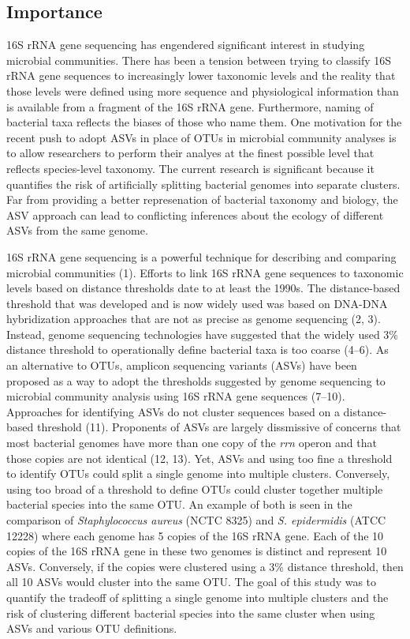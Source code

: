 \documentclass[
]{article}
\begin{document}
\hypertarget{importance}{%
\subsection{Importance}\label{importance}}

16S rRNA gene sequencing has engendered significant interest in studying
microbial communities. There has been a tension between trying to
classify 16S rRNA gene sequences to increasingly lower taxonomic levels
and the reality that those levels were defined using more sequence and
physiological information than is available from a fragment of the 16S
rRNA gene. Furthermore, naming of bacterial taxa reflects the biases of
those who name them. One motivation for the recent push to adopt ASVs in
place of OTUs in microbial community analyses is to allow researchers to
perform their analyes at the finest possible level that reflects
species-level taxonomy. The current research is significant because it
quantifies the risk of artificially splitting bacterial genomes into
separate clusters. Far from providing a better represenation of
bacterial taxonomy and biology, the ASV approach can lead to conflicting
inferences about the ecology of different ASVs from the same genome.

\newpage

16S rRNA gene sequencing is a powerful technique for describing and
comparing microbial communities (1). Efforts to link 16S rRNA gene
sequences to taxonomic levels based on distance thresholds date to at
least the 1990s. The distance-based threshold that was developed and is
now widely used was based on DNA-DNA hybridization approaches that are
not as precise as genome sequencing (2, 3). Instead, genome sequencing
technologies have suggested that the widely used 3\% distance threshold
to operationally define bacterial taxa is too coarse (4--6). As an
alternative to OTUs, amplicon sequencing variants (ASVs) have been
proposed as a way to adopt the thresholds suggested by genome sequencing
to microbial community analysis using 16S rRNA gene sequences (7--10).
Approaches for identifying ASVs do not cluster sequences based on a
distance-based threshold (11). Proponents of ASVs are largely
dissmissive of concerns that most bacterial genomes have more than one
copy of the \emph{rrn} operon and that those copies are not identical
(12, 13). Yet, ASVs and using too fine a threshold to identify OTUs
could split a single genome into multiple clusters. Conversely, using
too broad of a threshold to define OTUs could cluster together multiple
bacterial species into the same OTU. An example of both is seen in the
comparison of \emph{Staphylococcus aureus} (NCTC 8325) and \emph{S.
epidermidis} (ATCC 12228) where each genome has 5 copies of the 16S rRNA
gene. Each of the 10 copies of the 16S rRNA gene in these two genomes is
distinct and represent 10 ASVs. Conversely, if the copies were clustered
using a 3\% distance threshold, then all 10 ASVs would cluster into the
same OTU. The goal of this study was to quantify the tradeoff of
splitting a single genome into multiple clusters and the risk of
clustering different bacterial species into the same cluster when using
ASVs and various OTU definitions.
\end{document}
